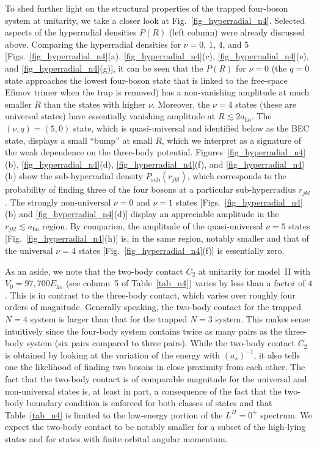 \documentclass[aps,pra,twocolumn,showpacs,superscriptaddress]{revtex4}
\begin{document}
To shed further light on the structural properties of the
trapped four-boson system at unitarity, we take a closer
look at Fig.~\ref{fig_hyperradial_n4}.
Selected aspects of the hyperradial densities $P(R)$ (left column)
were already discussed above. Comparing the
hyperradial densities for $\nu=0$, 1, 4, and 5
[Figs.~\ref{fig_hyperradial_n4}(a),
\ref{fig_hyperradial_n4}(c),
\ref{fig_hyperradial_n4}(e),
and
\ref{fig_hyperradial_n4}(g)],
it can be seen that the $P(R)$
for $\nu=0$ (the $q=0$ state approaches the
lowest four-boson state that is linked to the free-space Efimov trimer
when the trap is removed) has a non-vanishing amplitude at
much smaller $R$ than the states with higher $\nu$.
Moreover, the $\nu=4$ states (these are universal states)
have essentially vanishing amplitude at $R \lesssim 2 a_{\text{ho}}$.
The $(\nu,q)=(5,0)$ state, which is 
quasi-universal and identified below as the BEC state,
displays a small ``bump''
at small $R$,
which we interpret as a signature of the weak dependence on the three-body
potential.
Figures~\ref{fig_hyperradial_n4}(b), \ref{fig_hyperradial_n4}(d),
\ref{fig_hyperradial_n4}(f), and \ref{fig_hyperradial_n4}(h)
show 
the sub-hyperradial density
$P_{\text{sub}}(r_{jkl})$, which corresponds to the 
probability of finding three of the four bosons at a particular
sub-hyperradius $r_{jkl}$.
The strongly non-universal $\nu=0$ and $\nu=1$ states
[Figs.~\ref{fig_hyperradial_n4}(b) and \ref{fig_hyperradial_n4}(d)]
display an appreciable amplitude in the $r_{jkl} \lesssim a_{\text{ho}}$
region.
By comparion, the amplitude of the quasi-universal
$\nu=5$ states [Fig.~\ref{fig_hyperradial_n4}(h)]
is, in the same region, notably smaller
and that
of the universal $\nu=4$ states [Fig.~\ref{fig_hyperradial_n4}(f)]
is essentially zero.

As an aside, we note that the two-body contact 
$C_2$ at unitarity for model~II with
$V_0=97,700 E_{\text{ho}}$ (see column~5 of Table~\ref{tab_n4})
varies by less than a factor of
$4$. This is in contrast to the
three-body contact, which 
varies over roughly
four orders of magnitude.
Generally speaking, the two-body contact
for the trapped $N=4$ system is larger than that for the
trapped $N=3$ system. This makes sense intuitively since the 
four-body system contains twice as many pairs
as the three-body system (six pairs compared to three pairs).
While the two-body contact $C_2$ is obtained by looking
at the variation of the energy with $(a_s)^{-1}$,
it also tells one the likelihood of finding two bosons in close proximity
from each other. The fact that the two-body contact
is of comparable magnitude for the universal and non-universal states
is, at least in part, a consequence of the fact that the two-body
boundary condition is enforced for both classes of states and that
Table~\ref{tab_n4} is limited to the low-energy portion of the
$L^{\Pi}=0^+$ spectrum. We expect 
the two-body contact to be notably smaller for
a subset of the high-lying states and for 
states with finite orbital angular momentum.
\end{document}
